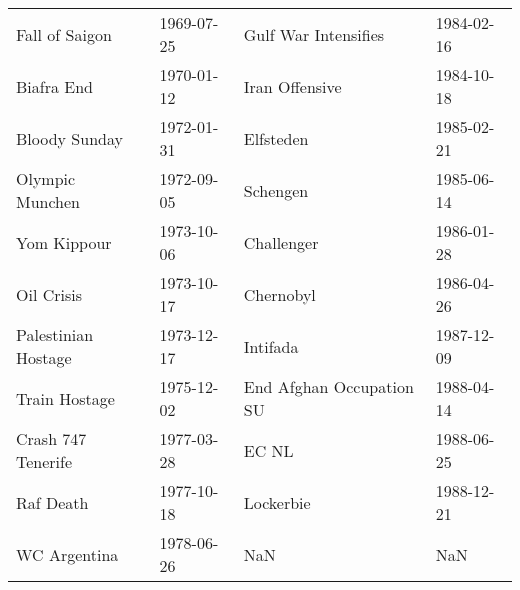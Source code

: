 \begin{tabular}{llll}
       Fall of Saigon &  1969-07-25 &            Gulf War Intensifies &  1984-02-16 \\
           Biafra End &  1970-01-12 &                  Iran Offensive &  1984-10-18 \\
        Bloody Sunday &  1972-01-31 &                       Elfsteden &  1985-02-21 \\
      Olympic Munchen &  1972-09-05 &                        Schengen &  1985-06-14 \\
          Yom Kippour &  1973-10-06 &                      Challenger &  1986-01-28 \\
           Oil Crisis &  1973-10-17 &                       Chernobyl &  1986-04-26 \\
  Palestinian Hostage &  1973-12-17 &                        Intifada &  1987-12-09 \\
        Train Hostage &  1975-12-02 &        End Afghan Occupation SU &  1988-04-14 \\
   Crash 747 Tenerife &  1977-03-28 &                           EC NL &  1988-06-25 \\
            Raf Death &  1977-10-18 &                       Lockerbie &  1988-12-21 \\
         WC Argentina &  1978-06-26 &                             NaN &         NaN \\
\bottomrule
\end{tabular}

